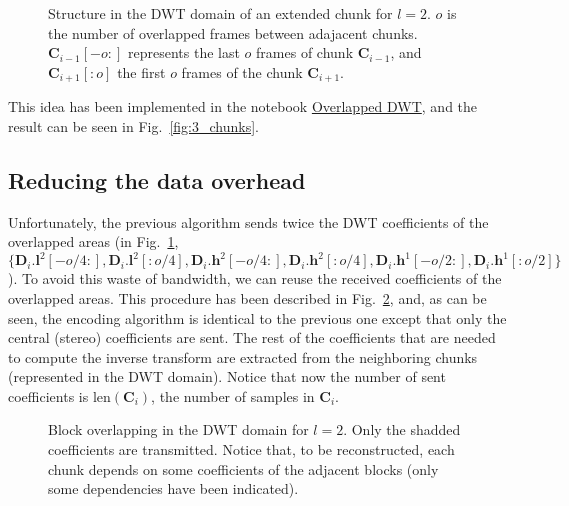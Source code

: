 
\begin{figure}
  \centering
  \caption{Structure in the DWT domain of an extended chunk for
    $l=2$. $o$ is the number of overlapped frames between adajacent
    chunks. ${\mathbf C}_{i-1}[-o:]$ represents the last $o$ frames of
    chunk ${\mathbf C}_{i-1}$, and ${\mathbf C}_{i+1}[:o]$ the first
    $o$ frames of the chunk ${\mathbf C}_{i+1}$.}
  \label{fig:subbands}
\end{figure}

This idea has been implemented in the notebook
\href{https://github.com/Tecnologias-multimedia/Tecnologias-multimedia.github.io/blob/master/contents/transform_coding/overlapped_DWT_I.ipynb}{Overlapped
  DWT}, and the result can be seen in Fig.~\ref{fig:3_chunks}.


\subsection{Reducing the data overhead}

\label{sec:reducing}

Unfortunately, the previous algorithm sends twice the DWT coefficients
of the overlapped areas (in Fig.~\ref{fig:subbands}, $\{{\mathbf
  D}_i.{\mathbf l}^2[-o/4:], {\mathbf D}_i.{\mathbf l}^2[:o/4],
{\mathbf D}_i.{\mathbf h}^2[-o/4:], {\mathbf D}_i.{\mathbf
  h}^2[:o/4], {\mathbf D}_i.{\mathbf h}^1[-o/2:], {\mathbf
  D}_i.{\mathbf h}^1[:o/2]\}$). To avoid this waste of bandwidth, we
can reuse the received coefficients of the overlapped areas. This
procedure has been described in Fig.~\ref{fig:overlapping}, and,
as can be seen, the encoding algorithm is identical to the previous
one except that only the central (stereo) coefficients are
sent. The rest of the coefficients that are needed to compute the inverse
transform are extracted from the neighboring chunks (represented in the
DWT domain). Notice that now the number of sent coefficients is
$\text{len}({\mathbf C}_i)$, the number of samples in ${\mathbf C}_i$.

\begin{figure}
  \centering
  \caption{Block overlapping in the DWT domain for $l=2$. Only the
    shadded coefficients are transmitted. Notice that, to be
    reconstructed, each chunk depends on some coefficients of the
    adjacent blocks (only some dependencies have been indicated).}
  \label{fig:overlapping}
\end{figure}

